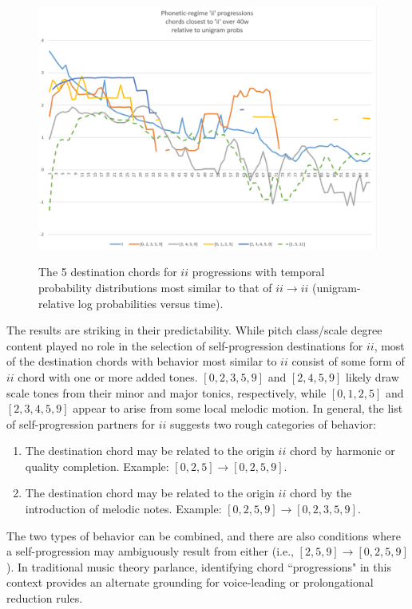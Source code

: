 \begin{figure}
	\centering
	\caption{The 5 destination chords for $ii$ progressions with temporal probability distributions most similar to that of $ii \rightarrow ii$ (unigram-relative log probabilities versus time).}
	\includegraphics[width=6in]{ii_phonetic.png}
	\label{ii_phonetic}
\end{figure}

The results are striking in their predictability.  While pitch class/scale degree content played no role in the selection of self-progression destinations for $ii$, most of the destination chords with behavior most similar to $ii$ consist of some form of $ii$ chord with one or more added tones. $[0,2,3,5,9]$ and $[2,4,5,9]$ likely draw scale tones from their minor and major tonics, respectively, while $[0,1,2,5]$ and $[2,3,4,5,9]$ appear to arise from some local melodic motion.  In general, the list of self-progression partners for $ii$ suggests two rough categories of behavior:
\begin{enumerate}
	\item The destination chord may be related to the origin $ii$ chord by harmonic or quality completion.  Example: $[0,2,5] \rightarrow [0,2,5,9]$.
	\item The destination chord may be related to the origin $ii$ chord by the introduction of melodic notes. Example: $[0,2,5,9] \rightarrow [0,2,3,5,9]$.
\end{enumerate}
The two types of behavior can be combined, and there are also conditions where a self-progression may ambiguously result from either (i.e., $[2,5,9] \rightarrow [0,2,5,9]$).  In traditional music theory parlance, identifying chord ``progressions" in this context provides an alternate grounding for voice-leading or prolongational reduction rules.

